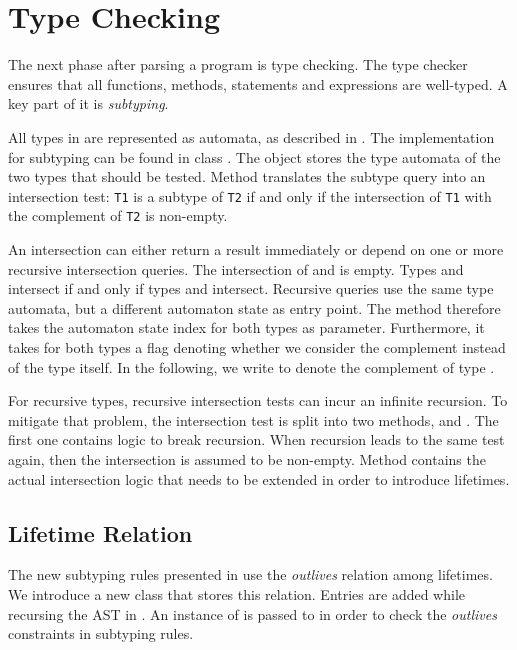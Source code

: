 \section{Type Checking}\label{section:type-checking}

The next phase after parsing a \whiley program is type checking.
The type checker ensures that all functions, methods, statements and expressions are well-typed.
A key part of it is \emph{subtyping}.

All types in \whiley are represented as automata, as described in .
The implementation for subtyping can be found in class .
The  object stores the type automata of the two types that should be tested.
Method  translates the subtype query into an intersection test:
\texttt{T1} is a subtype of \texttt{T2} if and only if the intersection of \texttt{T1} with the complement of \texttt{T2} is non-empty.

An intersection can either return a result immediately or depend on one or more recursive intersection queries.
The intersection of  and  is empty.
Types  and  intersect if and only if types  and  intersect.
Recursive queries use the same type automata, but a different automaton state as entry point.
The  method therefore takes the automaton state index for both types as parameter.
Furthermore, it takes for both types a flag denoting whether we consider the complement instead of the type itself.
In the following, we write  to denote the complement of type .

For recursive types, recursive intersection tests can incur an infinite recursion.
To mitigate that problem, the intersection test is split into two methods,  and .
The first one contains logic to break recursion.
When recursion leads to the same test again, then the intersection is assumed to be non-empty.
Method  contains the actual intersection logic that needs to be extended in order to introduce lifetimes.


\subsection{Lifetime Relation}
The new subtyping rules presented in  use the \emph{outlives} relation among lifetimes.
We introduce a new class  that stores this relation.
Entries are added while recursing the AST in .
An instance of  is passed to  in order to check the \emph{outlives} constraints in subtyping rules.

